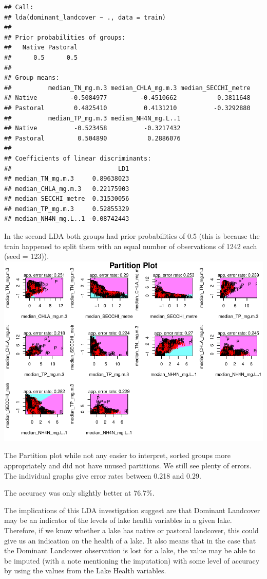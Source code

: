 \documentclass[
]{article}
\begin{document}
\begin{verbatim}
## Call:
## lda(dominant_landcover ~ ., data = train)
## 
## Prior probabilities of groups:
##   Native Pastoral 
##      0.5      0.5 
## 
## Group means:
##          median_TN_mg.m.3 median_CHLA_mg.m.3 median_SECCHI_metre
## Native         -0.5084977         -0.4510662           0.3811648
## Pastoral        0.4825410          0.4131210          -0.3292880
##          median_TP_mg.m.3 median_NH4N_mg.L..1
## Native          -0.523458          -0.3217432
## Pastoral         0.504890           0.2886076
## 
## Coefficients of linear discriminants:
##                             LD1
## median_TN_mg.m.3     0.89638023
## median_CHLA_mg.m.3   0.22175903
## median_SECCHI_metre  0.31530056
## median_TP_mg.m.3     0.52855329
## median_NH4N_mg.L..1 -0.08742443
\end{verbatim}

In the second LDA both groups had prior probabilities of 0.5 (this is because the train happened to split them with an equal number of observations of 1242 each (seed = 123)).\\

\includegraphics{Final-Report_files/figure-latex/unnamed-chunk-6-1.pdf}

The Partition plot while not any easier to interpret, sorted groups more appropriately and did not have unused partitions. We still see plenty of errors. The individual graphs give error rates between 0.218 and 0.29.

The accuracy was only slightly better at 76.7\%.

The implications of this LDA investigation suggest are that Dominant Landcover may be an indicator of the levels of lake health variables in a given lake. Therefore, if we know whether a lake has native or pastoral landcover, this could give us an indication on the health of a lake. It also means that in the case that the Dominant Landcover observation is lost for a lake, the value may be able to be imputed (with a note mentioning the imputation) with some level of accuracy by using the values from the Lake Health variables.
\end{document}
